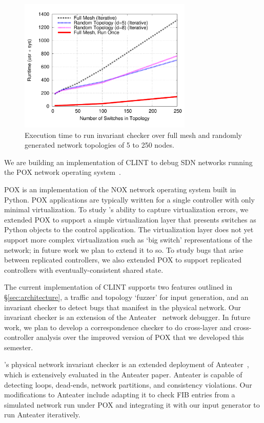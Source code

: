 
    \begin{figure}[t]
        \hspace{-10pt}
        \includegraphics[width=3.25in]{graph}
        \caption[]{\label{fig:anteatertime} Execution time to run invariant checker over full mesh and randomly generated network topologies of 5 to 250 nodes.} 
    \end{figure}



    We are building an implementation of CLINT to debug SDN networks running the POX network operating system~\cite{pox}.
    
    POX is an implementation of the NOX network operating system built in Python.
    POX applications are typically written for a single controller with only minimal virtualization.
    To study \projectname{}'s ability to capture virtualization errors, we extended POX
    to support a simple virtualization layer that presents switches as Python objects to the control application.
    The virtualization layer does not yet support more complex virtualization such as `big switch' representations 
    of the network; in future work we plan to extend it to so.
    To study bugs that arise between replicated controllers, we also extended POX to support replicated controllers
    with eventually-consistent shared state.

    The current implementation of CLINT supports two features outlined in \S\ref{sec:architecture}, a traffic and topology `fuzzer' for input generation, and an invariant checker to detect bugs that manifest in the physical network.
    Our invariant checker is an extension of the Anteater~\cite{anteater} network debugger.
    In future work, we plan to develop a correspondence checker to do cross-layer and cross-controller analysis over the improved version of POX that we developed this semester.
    
    \projectname{}'s physical network invariant checker is an extended deployment of Anteater~\cite{anteater}, which is extensively evaluated in the Anteater paper.
    Anteater is capable of detecting loops, dead-ends, network partitions, and consistency violations.
    Our modifications to Anteater include adapting it to check FIB entries from a simulated network run under POX and integrating it with our input generator to run Anteater iteratively.
   
